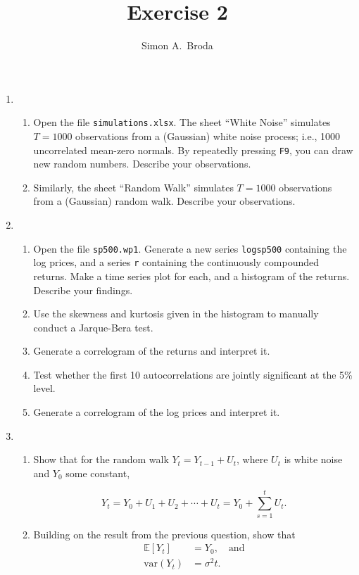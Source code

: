 \documentclass[11pt, a4paper]{article}
\newcommand{\E}{\ensuremath{{\mathbb E}}} %
\begin{document}
\title{Exercise 2}
\author{Simon A.\ Broda}
\date{}
\maketitle

\begin{enumerate}
\item
\begin{enumerate}
\item Open the file \texttt{simulations.xlsx}. The sheet ``White Noise'' simulates $T=1000$ observations from a (Gaussian) white noise process; i.e., 1000 uncorrelated mean-zero normals. By repeatedly pressing \texttt{F9}, you can draw new random numbers. Describe your observations.
\item Similarly, the sheet ``Random Walk'' simulates $T=1000$ observations from a (Gaussian) random walk. Describe your observations.
\end{enumerate}
\item
\begin{enumerate}
\item Open the file \texttt{sp500.wp1}. Generate a new series \texttt{logsp500} containing the log prices, and a series \texttt{r} containing the continuously compounded returns. Make a time series plot for each, and a histogram of the returns. Describe your findings.
\item Use the skewness and kurtosis given in the histogram to manually conduct a Jarque-Bera test.
\item Generate a correlogram of the returns and interpret it.
\item Test whether the first 10 autocorrelations are jointly significant at the 5\% level.
\item Generate a correlogram of the log prices and interpret it.
\end{enumerate}
\item
\begin{enumerate}
\item Show that for the random walk $Y_t=Y_{t-1}+U_t$, where $U_t$ is white noise and $Y_0$ some constant,

\[
Y_t=Y_0+U_1+U_2+\cdots+U_t=Y_0+\sum_{s=1}^t U_t.
\]
\item Building on the result from the previous question, show that
\begin{align*}
\E[Y_t]&=Y_0,\quad\mbox{and} \\
\mathrm{var}(Y_t)&=\sigma ^2t.
\end{align*}

\end{enumerate}
\end{enumerate}
\end{document}
